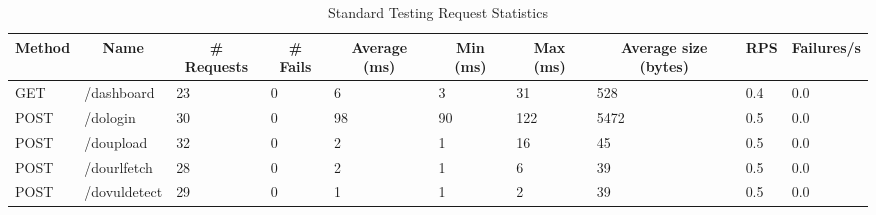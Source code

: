 \begin{table*}[h]
  \caption{Standard Testing Request Statistics}
  \label{tab:stdreqstat}
  \begin{tabular}{|l|l|l|l|l|l|l|l|l|l|}
  \hline
  \multicolumn{1}{|c|}{\textbf{Method}} & \multicolumn{1}{c|}{\textbf{Name}} & \multicolumn{1}{c|}{\textbf{\# Requests}} & \multicolumn{1}{c|}{\textbf{\# Fails}} & \multicolumn{1}{c|}{\textbf{Average (ms)}} & \multicolumn{1}{c|}{\textbf{Min (ms)}} & \multicolumn{1}{c|}{\textbf{Max (ms)}} & \multicolumn{1}{c|}{\textbf{Average size (bytes)}} & \multicolumn{1}{c|}{\textbf{RPS}} & \multicolumn{1}{c|}{\textbf{Failures/s}} \\ \hline
  GET                                   & /dashboard                         & 23                                        & 0                                      & 6                                          & 3                                      & 31                                     & 528                                                & 0.4                               & 0.0                                      \\ \hline
  {\color[HTML]{2A2B2E} POST}           & /dologin                           & 30                                        & 0                                      & 98                                         & 90                                     & 122                                    & 5472                                               & 0.5                               & 0.0                                      \\ \hline
  {\color[HTML]{2A2B2E} POST}           & /doupload                          & 32                                        & 0                                      & 2                                          & 1                                      & 16                                     & 45                                                 & 0.5                               & 0.0                                      \\ \hline
  POST                                  & /dourlfetch                        & 28                                        & 0                                      & 2                                          & 1                                      & 6                                      & 39                                                 & 0.5                               & 0.0                                      \\ \hline
  POST                                  & /dovuldetect                       & 29                                        & 0                                      & 1                                          & 1                                      & 2                                      & 39                                                 & 0.5                               & 0.0                                      \\ \hline

\end{tabular}
\end{table*}
